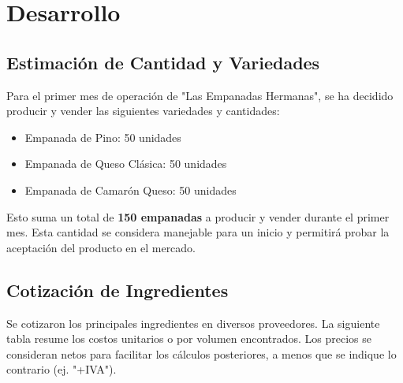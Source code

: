 \documentclass[12pt]{article}
\begin{document}
\newpage

\section{Desarrollo} %

\subsection{Estimación de Cantidad y Variedades}
Para el primer mes de operación de "Las Empanadas Hermanas", se ha decidido producir y vender las siguientes variedades y cantidades:
\begin{itemize}
    \item Empanada de Pino: 50 unidades
    \item Empanada de Queso Clásica: 50 unidades
    \item Empanada de Camarón Queso: 50 unidades
\end{itemize}
Esto suma un total de \textbf{150 empanadas} a producir y vender durante el primer mes. Esta cantidad se considera manejable para un inicio y permitirá probar la aceptación del producto en el mercado.

\subsection{Cotización de Ingredientes}
Se cotizaron los principales ingredientes en diversos proveedores. La siguiente tabla resume los costos unitarios o por volumen encontrados. Los precios se consideran netos para facilitar los cálculos posteriores, a menos que se indique lo contrario (ej. "+IVA").
\end{document}
